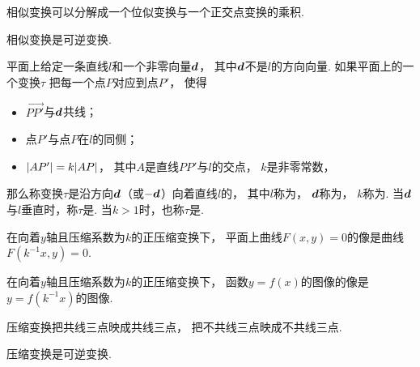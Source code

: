 \begin{proposition}
相似变换可以分解成一个位似变换与一个正交点变换的乘积.
\end{proposition}

\begin{proposition}
相似变换是可逆变换.
\end{proposition}

\begin{definition}
平面上给定一条直线\(l\)和一个非零向量\(\boldsymbol{d}\)，
其中\(\boldsymbol{d}\)不是\(l\)的方向向量.
如果平面上的一个变换\(\tau\)
把每一个点\(P\)对应到点\(P'\)，
使得\begin{itemize}
	\item \(\vec{PP'}\)与\(\boldsymbol{d}\)共线；
	\item 点\(P'\)与点\(P\)在\(l\)的同侧；
	\item \(\abs{AP'} = k \abs{AP}\)，
	其中\(A\)是直线\(PP'\)与\(l\)的交点，
	\(k\)是非零常数，
\end{itemize}
那么称变换\(\tau\)是沿方向\(\boldsymbol{d}\)（或\(-\boldsymbol{d}\)）向着直线\(l\)的，
其中\(l\)称为，
\(\boldsymbol{d}\)称为，
\(k\)称为.
当\(\boldsymbol{d}\)与\(l\)垂直时，称\(\tau\)是.
当\(k>1\)时，也称\(\tau\)是.
\end{definition}

\begin{proposition}
在向着\(y\)轴且压缩系数为\(k\)的正压缩变换下，
平面上曲线\(F(x,y) = 0\)的像是曲线\(F(k^{-1}x,y) = 0\).
\end{proposition}

\begin{corollary}
在向着\(y\)轴且压缩系数为\(k\)的正压缩变换下，
函数\(y = f(x)\)的图像的像是\(y = f(k^{-1} x)\)的图像.
\end{corollary}

\begin{proposition}
压缩变换把共线三点映成共线三点，
把不共线三点映成不共线三点.
\end{proposition}

\begin{proposition}
压缩变换是可逆变换.
\end{proposition}

